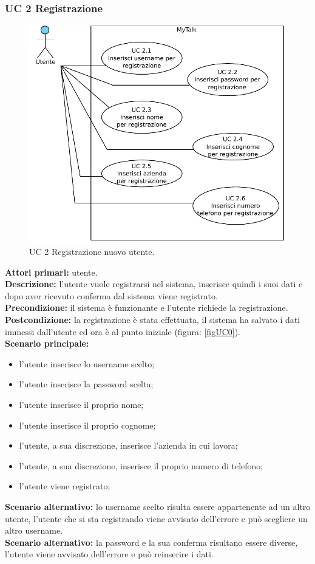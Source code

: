 \subsubsection{UC 2 Registrazione}

\begin{figure}[htbp]
\centering
\includegraphics[scale=0.7]{./casi_uso/UC2.pdf}
\caption{UC 2 Registrazione nuovo utente.}
\end{figure}

\noindent
\textbf{Attori primari:} utente.\\
\textbf{Descrizione:} l'utente vuole registrarsi nel sistema, inserisce quindi i suoi dati e dopo aver ricevuto conferma dal sistema viene registrato.\\
\textbf{Precondizione:} il sistema è funzionante e l'utente richiede la registrazione.\\
\textbf{Postcondizione:} la registrazione è stata effettuata, il sistema ha salvato i dati immessi dall'utente ed ora è al punto iniziale  (figura: \ref{figUC0}).\\
\textbf{Scenario principale:}
\begin{itemize}
\item l'utente inserisce lo username scelto;
\item l'utente inserisce la password scelta;
\item l'utente inserisce il proprio nome;
\item l'utente inserisce il proprio cognome;
\item l'utente, a sua discrezione, inserisce l'azienda in cui lavora;
\item l'utente, a sua discrezione, inserisce il proprio numero di telefono;
\item l'utente viene registrato;
\end{itemize}
\textbf{Scenario alternativo:} lo username scelto risulta essere appartenente ad un altro utente, l'utente che si sta registrando viene avvisato dell'errore e può scegliere un altro username.\\
\textbf{Scenario alternativo:} la password e la sua conferma risultano essere diverse, l'utente viene avvisato dell'errore e può reinserire i dati.

